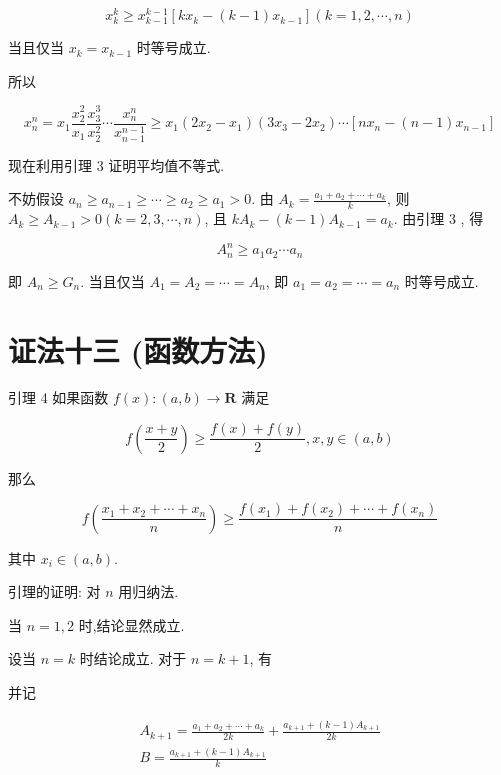 $$
x_{k}^{k} \geqslant x_{k-1}^{k-1}\left[k x_{k}-(k-1) x_{k-1}\right](k=1,2, \cdots, n)
$$

当且仅当 $x_{k}=x_{k-1}$ 时等号成立.

所以

$$
x_{n}^{n}=x_{1} \frac{x_{2}^{2}}{x_{1}} \frac{x_{3}^{3}}{x_{2}^{2}} \cdots \frac{x_{n}^{n}}{x_{n-1}^{n-1}} \geqslant x_{1}\left(2 x_{2}-x_{1}\right)\left(3 x_{3}-2 x_{2}\right) \cdots\left[n x_{n}-(n-1) x_{n-1}\right]
$$

现在利用引理 3 证明平均值不等式.

不妨假设 $a_{n} \geqslant a_{n-1} \geqslant \cdots \geqslant a_{2} \geqslant a_{1}>0$. 由 $A_{k}=\frac{a_{1}+a_{2}+\cdots+a_{k}}{k}$, 则 $A_{k} \geqslant A_{k-1}>0(k=2,3, \cdots, n)$, 且 $k A_{k}-(k-1) A_{k-1}=a_{k}$. 由引理 3 , 得

$$
A_{n}^{n} \geqslant a_{1} a_{2} \cdots a_{n}
$$

即 $A_{n} \geqslant G_{n}$. 当且仅当 $A_{1}=A_{2}=\cdots=A_{n}$, 即 $a_{1}=a_{2}=\cdots=a_{n}$ 时等号成立.

\section*{证法十三 (函数方法)}
引理 4 如果函数 $f(x):(a, b) \rightarrow \mathbf{R}$ 满足


\begin{equation*}
f\left(\frac{x+y}{2}\right) \geqslant \frac{f(x)+f(y)}{2}, x, y \in(a, b) \tag{13}
\end{equation*}


那么


\begin{equation*}
f\left(\frac{x_{1}+x_{2}+\cdots+x_{n}}{n}\right) \geqslant \frac{f\left(x_{1}\right)+f\left(x_{2}\right)+\cdots+f\left(x_{n}\right)}{n} \tag{14}
\end{equation*}


其中 $x_{i} \in(a, b)$.

引理的证明: 对 $n$ 用归纳法.

当 $n=1,2$ 时,结论显然成立.

设当 $n=k$ 时结论成立. 对于 $n=k+1$, 有

并记

$$
\begin{gathered}
A_{k+1}=\frac{a_{1}+a_{2}+\cdots+a_{k}}{2 k}+\frac{a_{k+1}+(k-1) A_{k+1}}{2 k} \\
B=\frac{a_{k+1}+(k-1) A_{k+1}}{k}
\end{gathered}
$$


